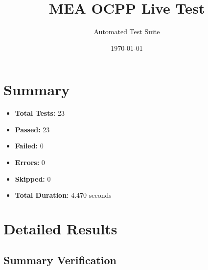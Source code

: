 \documentclass{article}
\title{MEA OCPP Live Test}
\author{Automated Test Suite}
\date{\today}
\begin{document}
\maketitle

\section{Summary}
\begin{itemize}
    \item \textbf{Total Tests:} 23
    \item \textbf{Passed:} 23
    \item \textbf{Failed:} 0
    \item \textbf{Errors:} 0
    \item \textbf{Skipped:} 0
    \item \textbf{Total Duration:} 4.470 seconds
\end{itemize}

\section{Detailed Results}
\subsection{Summary Verification}
\end{document}
